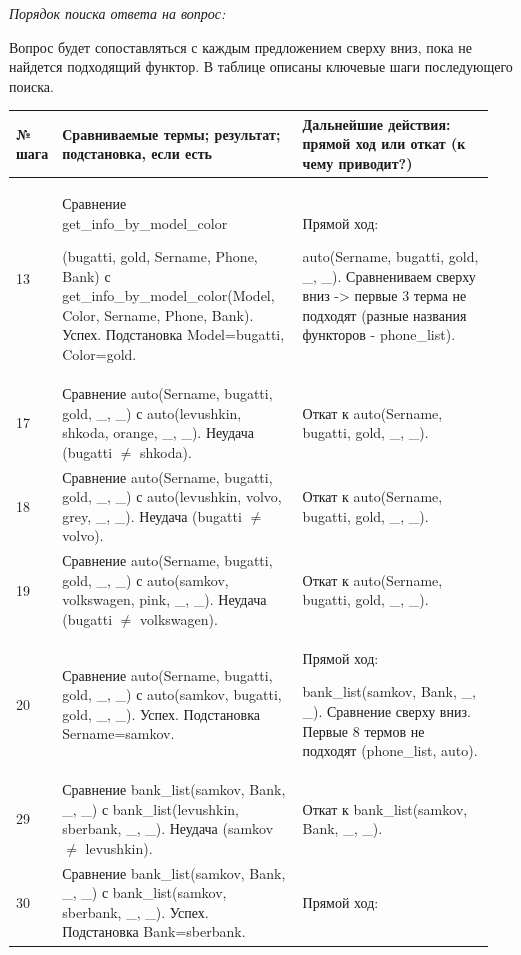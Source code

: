 \documentclass[a4paper,12pt]{article}
\begin{document}
	\textit{Порядок поиска ответа на вопрос:}
	
	Вопрос будет сопоставляться с каждым предложением сверху вниз, пока не
	найдется подходящий функтор. В таблице описаны ключевые шаги последующего поиска.
	
	\begin{center}
	\begin{longtable}[h!]{|p{0.05\linewidth}|p{0.5\linewidth}|p{ 0.4\linewidth}|}
				\hline
				{\bf  № шага} & {\bf Сравниваемые термы; результат; подстановка, если есть} & {\bf Дальнейшие действия: прямой ход или откат (к чему приводит?)} \\
				\hline
				{13} & {Сравнение get\_info\_by\_model\_color
					
					(bugatti, gold, Sername, Phone, Bank) с get\_info\_by\_model\_color(Model, Color, Sername, Phone, Bank). Успех. Подстановка Model=bugatti, Color=gold.} & {Прямой ход:
				
			auto(Sername, bugatti, gold, \_, \_). Сравнениваем сверху вниз -> первые 3 терма не подходят (разные названия функторов - phone\_list).}\\
				\hline
				{17} & {Сравнение auto(Sername, bugatti, gold, \_, \_) с auto(levushkin, shkoda, orange, \_, \_). Неудача (bugatti $\neq$ shkoda).} & {Откат к auto(Sername, bugatti, gold, \_, \_).}\\
				\hline
				{18} & {Сравнение auto(Sername, bugatti, gold, \_, \_) с auto(levushkin, volvo, grey, \_, \_). Неудача (bugatti $\neq$ volvo).} & {Откат к auto(Sername, bugatti, gold, \_, \_).}\\
				\hline
				{19} & {Сравнение auto(Sername, bugatti, gold, \_, \_) с auto(samkov, volkswagen, pink, \_, \_). Неудача (bugatti $\neq$ volkswagen).} & {Откат к auto(Sername, bugatti, gold, \_, \_).}\\
				\hline
				{20} & {Сравнение auto(Sername, bugatti, gold, \_, \_) с auto(samkov, bugatti, gold, \_, \_). Успех. Подстановка Sername=samkov.} & {Прямой ход:
					
					 bank\_list(samkov, Bank, \_, \_). Сравнение сверху вниз. Первые 8 термов не подходят (phone\_list, auto).}\\
				\hline
				{29} & {Сравнение bank\_list(samkov, Bank, \_, \_) с bank\_list(levushkin, sberbank, \_, \_). Неудача (samkov $\neq$ levushkin).} & {Откат к bank\_list(samkov, Bank, \_, \_).}\\
				\hline
				{30} & {Сравнение bank\_list(samkov, Bank, \_, \_) с bank\_list(samkov, sberbank, \_, \_). Успех. Подстановка Bank=sberbank.} & {Прямой ход:
				
}
\end{longtable}
\end{center}
\end{document}

